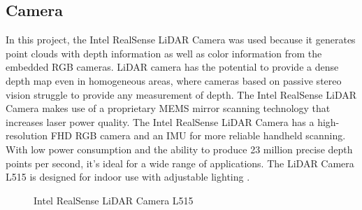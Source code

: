 \subsection{Camera\label{subsec:camera}} 
In this project, the Intel RealSense LiDAR Camera was used because it generates point clouds with depth information as well as color information from the embedded RGB cameras. LiDAR camera has the potential to provide a dense depth map even in homogeneous areas, where cameras based on passive stereo vision struggle to provide any measurement of depth. The Intel RealSense LiDAR Camera makes use of a proprietary MEMS mirror scanning technology that increases laser power quality. The Intel RealSense LiDAR Camera has a high-resolution FHD RGB camera and an IMU for more reliable handheld scanning. With low power consumption and the ability to produce 23 million precise depth points per second, it's ideal for a wide range of applications. The LiDAR Camera L515 is designed for indoor use with adjustable lighting \cite{noauthor_intel_nodate}.
\begin{figure}[h]
    \centering
    \hfill
    \hfill
    \caption{Intel RealSense LiDAR Camera L515 \cite{noauthor_intel_nodate}}
    \label{figure: lidar}
\end{figure}
\clearpage

